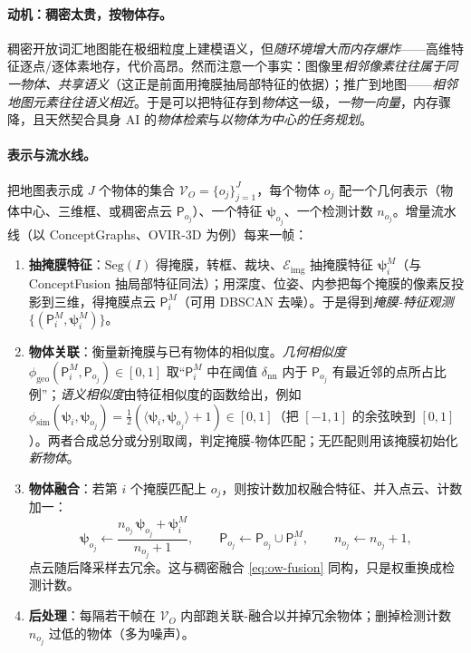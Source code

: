 \paragraph{动机：稠密太贵，按物体存。}
稠密开放词汇地图能在极细粒度上建模语义，但\emph{随环境增大而内存爆炸}——高维特征逐点/逐体素地存，代价高昂\cite{paull2026openworld}。然而注意一个事实：图像里\emph{相邻像素往往属于同一物体、共享语义}（这正是前面用掩膜抽局部特征的依据）；推广到地图——\emph{相邻地图元素往往语义相近}。于是可以把特征存到\emph{物体}这一级，\emph{一物一向量}，内存骤降，且天然契合具身 AI 的\emph{物体检索}与\emph{以物体为中心的任务规划}。

\paragraph{表示与流水线。}
把地图表示成 $J$ 个物体的集合 $\mathcal{V}_O=\{o_j\}_{j=1}^{J}$，每个物体 $o_j$ 配一个几何表示（物体中心、三维框、或稠密点云 $\mathsf{P}_{o_j}$）、一个特征 $\boldsymbol\psi_{o_j}$、一个检测计数 $n_{o_j}$\cite{paull2026openworld}。增量流水线（以 ConceptGraphs\cite{gu2024conceptgraphs}、OVIR-3D 为例）每来一帧：

\begin{enumerate}
  \item \textbf{抽掩膜特征}：$\mathrm{Seg}(I)$ 得掩膜，转框、裁块、$\mathcal{E}_{\mathrm{img}}$ 抽掩膜特征 $\boldsymbol\psi_i^{M}$（与 ConceptFusion 抽局部特征同法）；用深度、位姿、内参把每个掩膜的像素反投影到三维，得掩膜点云 $\mathsf{P}_i^{M}$（可用 DBSCAN 去噪）。于是得到\emph{掩膜-特征观测} $\{(\mathsf{P}_i^{M},\boldsymbol\psi_i^{M})\}$。
  \item \textbf{物体关联}：衡量新掩膜与已有物体的相似度。\emph{几何相似度} $\phi_{\mathrm{geo}}(\mathsf{P}_i^{M},\mathsf{P}_{o_j})\in[0,1]$ 取“$\mathsf{P}_i^{M}$ 中在阈值 $\delta_{\mathrm{nn}}$ 内于 $\mathsf{P}_{o_j}$ 有最近邻的点所占比例”；\emph{语义相似度}由特征相似度的函数给出，例如 $\phi_{\mathrm{sim}}(\boldsymbol\psi_i,\boldsymbol\psi_{o_j})=\tfrac12(\langle\boldsymbol\psi_i,\boldsymbol\psi_{o_j}\rangle+1)\in[0,1]$（把 $[-1,1]$ 的余弦映到 $[0,1]$）。两者合成总分或分别取阈，判定掩膜-物体匹配；无匹配则用该掩膜初始化\emph{新物体}。
  \item \textbf{物体融合}：若第 $i$ 个掩膜匹配上 $o_j$，则按计数加权融合特征、并入点云、计数加一：
  \begin{equation}
    \boldsymbol\psi_{o_j}\leftarrow\frac{n_{o_j}\,\boldsymbol\psi_{o_j}+\boldsymbol\psi_i^{M}}{n_{o_j}+1},\qquad
    \mathsf{P}_{o_j}\leftarrow\mathsf{P}_{o_j}\cup\mathsf{P}_i^{M},\qquad
    n_{o_j}\leftarrow n_{o_j}+1,
    \label{eq:ow-objfuse}
  \end{equation}
  点云随后降采样去冗余。这与稠密融合 \cref{eq:ow-fusion} 同构，只是权重换成检测计数。
  \item \textbf{后处理}：每隔若干帧在 $\mathcal{V}_O$ 内部跑关联-融合以并掉冗余物体；删掉检测计数 $n_{o_j}$ 过低的物体（多为噪声）。
\end{enumerate}

